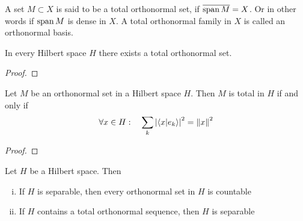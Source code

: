 \documentclass[../../script.tex]{subfiles}
\begin{document}
    \begin{defi}
        A set $M \subset X$ is said to be a total orthonormal set, if $\overline{\operatorname{span}{M}} = X$. Or in other words if $\operatorname{span}{M}$ is dense in $X$.
        A total orthonormal family in $X$ is called an orthonormal basis.
    \end{defi}

    \begin{thm}
        In every Hilbert space $H$ there exists a total orthonormal set.
    \end{thm}
    \begin{proof}
        \noproof
    \end{proof}

    \begin{thm}
        Let $M$ be an orthonormal set in a Hilbert space $H$. Then $M$ is total in $H$ if and only if 
        \[
            \forall x \in H: \quad \sum_k \abs{\innerproduct{x}{e_k}}^2 = \norm{x}^2
        \]
    \end{thm}
    \begin{proof}
        \noproof
    \end{proof}

    \begin{thm}
        Let $H$ be a Hilbert space. Then 
        \begin{enumerate}[(i)]
            \item If $H$ is separable, then every orthonormal set in $H$ is countable
            \item If $H$ contains a total orthonormal sequence, then $H$ is separable
        \end{enumerate}
    \end{thm}
\end{document}
